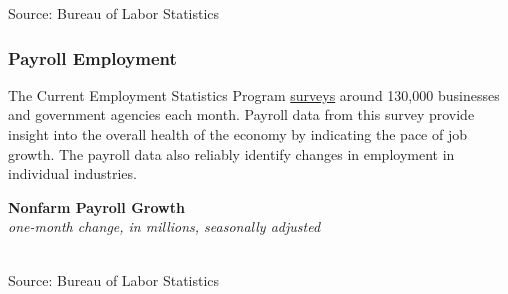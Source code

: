 \documentclass{report}
\makeatletter
\newcommand{\tbllink}[1]{\href{https://raw.githubusercontent.com/bdecon/US-chartbook/master/chartbook/data/#1}{\faTable}}
\newcommand*\short[1]{\expandafter\@gobbletwo\number\numexpr#1\relax}
\newcommand{\ctsbar}[5]{
		\addplot[ybar stacked, bar width=#5, draw opacity=0, fill=#1] 
			table [x=#2, y=#3, col sep=comma]{#4};}
\newcommand{\absnode}[3]{\node[below right, align=left] at (axis cs: #1,#2) {#3};}
\newcommand{\ltdateaxisticks}{
		date coordinates in=x, axis line style={draw=none},
		xmax={2022-10-31},
		max space between ticks=40,	    
		xtick={{2013-01-01}, {2014-01-01}, {2015-01-01}, {2016-01-01}, {2017-01-01}, {2018-01-01}, 
		    {2019-01-01}, {2020-01-01}, {2021-01-01}, {2022-01-01}},
		enlarge y limits={0.06}, enlarge x limits={0.01},
		}
\newcommand{\bbar}[2]{extra #1 ticks = {{#2}}, extra #1 tick labels = ,
		extra #1 tick style = {grid=major, grid style={thick, black!25}},}
\newcommand{\rbar}{
		\fill[color=black!10] (axis cs:{2020-02-01},\pgfkeysvalueof{/pgfplots/ymin}) rectangle 
			(axis cs:{2020-05-01}, \pgfkeysvalueof{/pgfplots/ymax});}
\makeatother
\begin{document}
{\begin{minipage}{0.76\textwidth}
\vspace{-1mm}	
\footnotesize{Source: Bureau of Labor Statistics}
\end{minipage}
\newpage
\begin{minipage}{0.76\textwidth}
\subsubsection*{Payroll Employment}
\small The Current Employment Statistics Program \href{https://www.bls.gov/ces/}{surveys} around 130,000 businesses and government agencies each month. Payroll data from this survey provide insight into the overall health of the economy by indicating the pace of job growth. The payroll data also reliably identify changes in employment in individual industries. 
\vspace{1mm}

\begin{minipage}{0.41\textwidth}
\small 
\end{minipage} \hfill
\begin{minipage}{0.52\textwidth}
\normalsize \textbf{Nonfarm Payroll Growth}\\
\footnotesize{\textit{one-month change, in millions, seasonally adjusted}}\\
\hspace*{-2mm} \\
\footnotesize{Source: Bureau of Labor Statistics} \hfill \tbllink{nfp.csv}
\end{minipage}
\vspace{3mm}


\end{minipage}}
\end{document}
